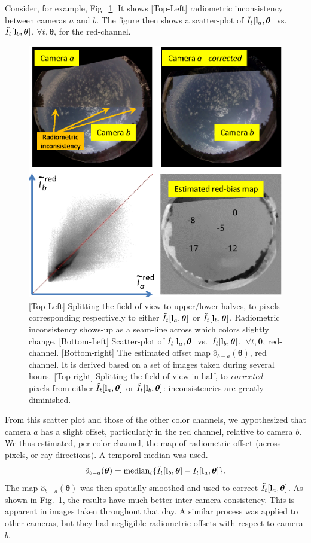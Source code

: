 \documentclass[runningheads]{llncs}
\begin{document}
Consider, for example, Fig.~\ref{fig:calibration}. It shows [Top-Left] radiometric inconsistency between cameras $a$ and $b$. The figure then shows a scatter-plot of
$\tilde I_t[{\bf l}_a,{\bm \theta}]$ vs.~$\tilde I_t[{\bf l}_{b},{\bm \theta}]$, $\forall t,{\bm \theta}$, for the red-channel.
\begin{figure}[t!]
\begin{center}
   \includegraphics[width=0.5\linewidth]{figures/bias1a.eps}
\end{center}
   \vspace{-0.6cm}
   \caption{[Top-Left] Splitting the field of view to upper/lower halves, to pixels corresponding
   respectively to either $\tilde I_t[{\bf l}_a,{\bm \theta}]$  or $\tilde I_t[{\bf l}_{b},{\bm \theta}]$. Radiometric inconsistency
   shows-up as a seam-line across which colors slightly change. [Bottom-Left] Scatter-plot of
   $\tilde I_t[{\bf l}_a,{\bm \theta}]$ vs.~$\tilde I_t[{\bf l}_{b},{\bm \theta}]$, $~\forall t,{\bm \theta}$, red-channel. [Bottom-right] The estimated offset map ${\hat o}_{b-a}({\bm \theta})$, red channel. It is derived based on a set of images taken during several hours.
   [Top-right] Splitting the field of view in half, to {\em corrected} pixels from either
   $\hat I_t[{\bf l}_a,{\bm \theta}]$  or $\hat I_t[{\bf l}_{b},{\bm \theta}]$: inconsistencies are greatly
   diminished.
   }
\label{fig:calibration}
\end{figure}
From this scatter plot and those of the other color channels, we hypothesized that camera $a$ has a slight offset, particularly in the red channel, relative to camera $b$. We thus estimated, per color channel, the map of radiometric offset (across pixels, or ray-directions). A temporal median was used.
\begin{equation}
 {\hat o}_{b-a}({\bm \theta})=
  {\rm median}_{t} \{\tilde I_t[{\bf l}_b,{\bm \theta}]-I_t[{\bf l}_a,{\bm \theta}]\}.
 \label{eq:hato}
\end{equation}
The map ${\hat o}_{b-a}({\bm \theta})$ was then spatially smoothed and used to correct $\tilde I_t[{\bf l}_a,{\bm \theta}]$. As shown in Fig.~\ref{fig:calibration}, the results have much better inter-camera consistency. This is apparent in images taken throughout that day. A similar process was applied to other cameras, but they had negligible radiometric offsets with respect to camera $b$.
\end{document}

